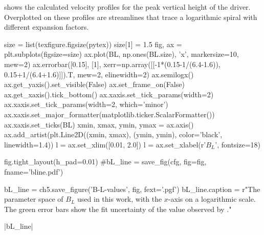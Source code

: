  shows the calculated velocity profiles for the peak vertical height of the driver.
Overplotted on these profiles are streamlines that trace a logarithmic spiral with different expansion factors.

\begin{pycode}[chapter5]
size = list(texfigure.figsize(pytex))
size[1] = 1.5
fig, ax = plt.subplots(figsize=size)
ax.plot(BL, np.ones(BL.size), 'x', markersize=10, mew=2)
ax.errorbar([0.15], [1], xerr=np.array([[-1*(0.15-1/(6.4-1.6)), 0.15+1/(6.4+1.6)]]).T, mew=2, elinewidth=2)
ax.semilogx()
ax.get_yaxis().set_visible(False)
ax.set_frame_on(False)
ax.get_xaxis().tick_bottom()
ax.xaxis.set_tick_params(width=2)
ax.xaxis.set_tick_params(width=2, which='minor')
ax.xaxis.set_major_formatter(matplotlib.ticker.ScalarFormatter())
ax.xaxis.set_ticks(BL)
xmin, xmax, ymin, ymax = ax.axis()
ax.add_artist(plt.Line2D((xmin, xmax), (ymin, ymin), color='black', linewidth=1.4))
l = ax.set_xlim([0.01, 2.0])
l = ax.set_xlabel(r'$B_L$', fontsize=18)

fig.tight_layout(h_pad=0.01)
#bL_line = save_fig(cfg, fig=fig, fname='bline.pdf')

bL_line = ch5.save_figure('B-L-values', fig, fext='.pgf')
bL_line.caption = r"The parameter space of $B_L$ used in this work, with the $x$-axis on a logarithmic scale. The green error bars show the fit uncertainty of the value observed by \citet{bonet2008}."
\end{pycode}

\py[chapter5]|bL_line|

